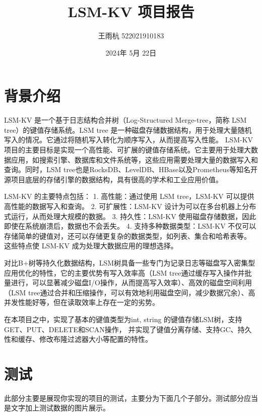 \documentclass[fontset=none]{article}
\title{LSM-KV 项目报告}
\author{王雨杭 522021910183}
\date{2024年 5月 22日}
\begin{document}
\maketitle

\section{背景介绍}
LSM-KV 是一个基于日志结构合并树（Log-Structured Merge-tree，简称 LSM tree）的键值存储系统。LSM tree 是一种磁盘存储数据结构，用于处理大量随机写入的情况。它通过将随机写入转化为顺序写入，从而提高写入性能。
LSM-KV 项目的主要目标是实现一个高性能、可扩展的键值存储系统。它主要用于处理大数据应用，如搜索引擎、数据库和文件系统等，这些应用需要处理大量的数据写入和查询。同时，LSM tree也是RocksDB、LevelDB、HBase以及Prometheus等知名开源项目底层的存储引擎的数据结构，具有很高的学术和工业应用价值。

LSM-KV 的主要特点包括：
1. 高性能：通过使用 LSM tree，LSM-KV 可以提供高性能的数据写入和查询。
2. 可扩展性：LSM-KV 设计为可以在多台机器上分布式运行，从而处理大规模的数据。
3. 持久性：LSM-KV 使用磁盘存储数据，因此即使在系统崩溃后，数据也不会丢失。
4. 支持多种数据类型：LSM-KV 不仅可以存储简单的键值对，还可以存储更复杂的数据类型，如列表、集合和哈希表等。
这些特点使 LSM-KV 成为处理大数据应用的理想选择。

对比B+树等持久化数据结构，LSM树具备一些专门为记录日志等磁盘写入密集型应用优化的特性，它的主要优势有写入效率高（LSM tree通过缓存写入操作并批量进行，可以显著减少磁盘I/O操作，从而提高写入效率）、高效的磁盘空间利用（LSM tree通过合并和压缩操作，可以有效地利用磁盘空间，减少数据冗余）、高并发性能好等，但在读取效率上存在一定的劣势。

在本项目之中，实现了基本的键值类型为{int, string} 的键值存储LSM树，支持GET、PUT、DELETE和SCAN操作， 并实现了键值分离存储、支持GC、持久性和缓存、修改布隆过滤器大小等配置的特性。



\section{测试}
此部分主要是展现你实现的项目的测试，主要分为下面几个子部分。测试部分应当是文字加上测试数据的图片展示。
\end{document}
